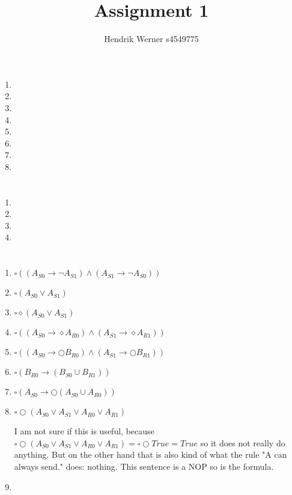 \documentclass[12pt, a4paper]{article}
\title{Assignment 1}
\author{Hendrik Werner s4549775}
\begin{document}
\maketitle

\section{} %
\begin{enumerate}[a]
	\item %
	\item %
	\item %
	\item %
	\item %
	\item %
	\item %
	\item %
\end{enumerate}

\section{} %
\begin{enumerate}[a]
	\item %
	\item %
	\item %
	\item %
\end{enumerate}

\section{} %
\begin{enumerate}[a]
	\item %
	$\square ((A_{S0} \rightarrow \lnot A_{S1}) \land (A_{S1} \rightarrow \lnot A_{S0}))$
	\item %
	$\square (A_{S0} \lor A_{S1})$
	\item %
	$\square \diamond (A_{S0} \lor A_{S1})$
	\item %
	$\square ((A_{S0} \rightarrow \diamond A_{R0}) \land (A_{S1} \rightarrow \diamond A_{R1}))$
	\item %
	$\square ((A_{S0} \rightarrow \bigcirc B_{R0}) \land (A_{S1} \rightarrow \bigcirc B_{R1}))$
	\item %
	$\square (B_{R0} \rightarrow (B_{S0} \cup B_{R1}))$
	\item %
	$\square (A_{S0} \rightarrow \bigcirc (A_{S0} \cup A_{R0}))$
	\item %
	$\square \bigcirc (A_{S0} \lor A_{S1} \lor A_{R0} \lor A_{R1})$

	I am not sure if this is useful, because $\square \bigcirc (A_{S0} \lor A_{S1} \lor A_{R0} \lor A_{R1}) = \square \bigcirc True = True$ so it does not really do anything. But on the other hand that is also kind of what the rule "A can always send." does: nothing. This sentence is a NOP so is the formula.
	\item %
\end{enumerate}
\end{document}
